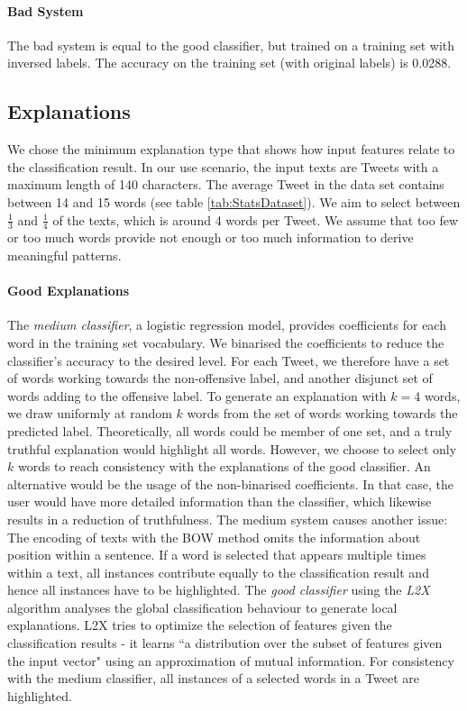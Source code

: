 \paragraph{Bad System}
The bad system is equal to the good classifier, but trained on a training set with inversed labels. The accuracy on the training set (with original labels) is 0.0288.



\subsection{Explanations} 
\label{subsec:impl_expl}
We chose the minimum explanation type that shows how input features relate to the classification result. In our use scenario, the input texts are Tweets with a maximum length of 140 characters. The average Tweet in the data set contains between 14 and 15 words (see table \ref{tab:StatsDataset}). We aim to select between $\frac{1}{3}$ and $\frac{1}{4}$ of the texts, which is around 4 words per Tweet. We assume that too few or too much words provide not enough or too much information to derive meaningful patterns. 

\paragraph{Good Explanations}
The \textit{medium classifier}, a logistic regression model, provides coefficients for each word in the training set vocabulary. We binarised the coefficients to reduce the classifier's accuracy to the desired level. For each Tweet, we therefore have a set of words working towards the non-offensive label, and another disjunct set of words adding to the offensive label. To generate an explanation with $k=4$ words, we draw uniformly at random $k$ words from the set of words working towards the predicted label. Theoretically, all words could be member of one set, and a truly truthful explanation would highlight all words. However, we choose to select only $k$ words to reach consistency with the explanations of the good classifier. An alternative would be the usage of the non-binarised coefficients. In that case, the user would have more detailed information than the classifier, which likewise results in a reduction of truthfulness. The medium system causes another issue: The encoding of texts with the BOW method omits the information about position within a sentence. If a word is selected that appears multiple times within a text, all instances contribute equally to the classification result and hence all instances have to be highlighted. The \textit{good classifier} using the \textit{L2X} algorithm analyses the global classification behaviour to generate local explanations. L2X tries to optimize the selection of features given the classification results - it learns ``a distribution over the subset of features given the input vector" \cite{chen2018learning} using an approximation of mutual information. For consistency with the medium classifier, all instances of a selected words in a Tweet are highlighted.

